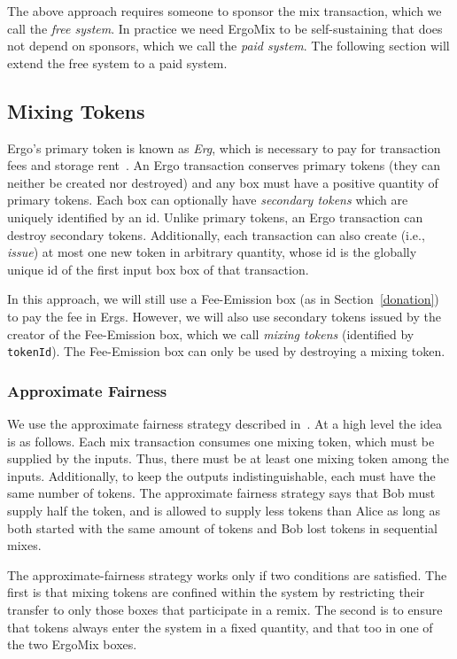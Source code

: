 \documentclass[runningheads]{llncs}
\newcommand{\mixname}{ErgoMix\xspace}
\begin{document}
The above approach requires someone to sponsor the mix transaction, which we call the {\em free system}. In practice we need \mixname to be self-sustaining that does not depend on sponsors, which we call the {\em paid system}. 
The following section will extend the free system to a paid system. 

\subsection{Mixing Tokens}

Ergo's primary token is known as {\em Erg}, which is necessary to pay for transaction fees and storage rent~\cite{chepurnoy2018systematic}. An Ergo transaction conserves primary tokens (they can neither be created nor destroyed) and any box must have a positive quantity of primary tokens.
Each box can optionally have {\em secondary tokens} which are uniquely identified by an id. Unlike primary tokens, an Ergo transaction can destroy secondary tokens. Additionally, each transaction can also create (i.e., {\em issue}) at most one new token in arbitrary quantity, whose id is the globally unique id of the first input box box of that transaction. 

In this approach, we will still use a Fee-Emission box (as in Section~\ref{donation}) to pay the fee in Ergs. However, we will also use secondary tokens issued by the creator of the Fee-Emission box, which we call {\em mixing tokens} (identified by \texttt{tokenId}). The Fee-Emission box can only be used by destroying a mixing token.

\subsubsection{Approximate Fairness}

We use the approximate fairness strategy described in~\cite{advtutorial}. At a high level the idea is as follows.
Each mix transaction consumes one mixing token, which must be supplied by the inputs. Thus, there must be at least one mixing token among the inputs. Additionally, to keep the outputs indistinguishable, each must have the same number of tokens. The approximate fairness strategy says that Bob must supply half the token, and is allowed to supply less tokens than Alice as long as both started with the same amount of tokens and Bob lost tokens in sequential mixes.

The approximate-fairness strategy works only if two conditions are satisfied. The first is that mixing tokens are confined within the system by restricting their transfer to only those boxes that participate in a remix. 
The second is to ensure that tokens always enter the system in a fixed quantity, and that too in one of the two \mixname boxes. 
\end{document}
